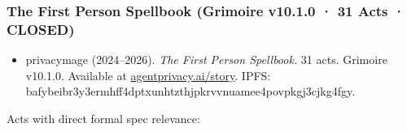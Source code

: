 \documentclass[
]{article}
\providecommand{\tightlist}{%
  \setlength{\itemsep}{0pt}\setlength{\parskip}{0pt}}
\begin{document}
\subsubsection{The First Person Spellbook (Grimoire v10.1.0 · 31 Acts ·
CLOSED)}\label{the-first-person-spellbook-grimoire-v10.1.0-31-acts-closed}

\begin{itemize}
\tightlist
\item
  privacymage (2024--2026). \emph{The First Person Spellbook.} 31 acts.
  Grimoire v10.1.0. Available at
  \href{https://agentprivacy.ai/story}{agentprivacy.ai/story}. IPFS:
  bafybeibr3y3ermhff4dptxunhtzthjpkrvvnuamee4povpkgj3cjkg4fgy.
\end{itemize}

Acts with direct formal spec relevance:
\end{document}
